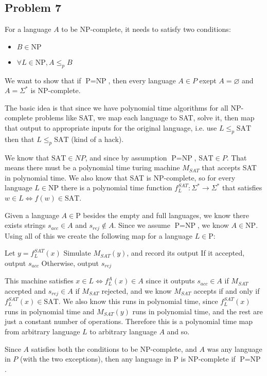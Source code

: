 \documentclass[english]{article}
\begin{document}
\subsection*{Problem 7}
For a language $A$ to be NP-complete, it needs to satisfy two conditions:
\begin{itemize}
\item $B \in \textrm{NP}$
\item $\forall L \in \textrm{NP}, A \le_p B$
\end{itemize}
We want to show that if $\textrm{P} = \textrm{NP}$, then every language
$A \in P$ exept $A = \varnothing$ and $A = \Sigma^*$ is NP-complete. 

The basic idea is that since we have polynomial time algorithms for all
NP-complete problems like SAT, we map each language to SAT, solve it, then map
that output to appropriate inputs for the original language, i.e. use
$L \le_p \textrm{SAT}$ then that $L \le_p \textrm{SAT}$ (kind of a hack). 

We know that $\textrm{SAT} \in NP$, and since by assumption
$\textrm{P} = \textrm{NP}$, $\textrm{SAT} \in P$. That means there must be a
polynomial time turing machine $M_{SAT}$ that accepts SAT in polynomial time.
We also know that SAT is NP-complete, so for every language $L \in \textrm{NP}$
there is a polynomial time function $f^{SAT}_L : \Sigma^* \rightarrow \Sigma^*$
that satisfies $w \in L \iff f(w) \in \textrm{SAT}$.

Given a language $A \in \textrm{P}$ besides the empty and full languages, we 
know there exists strings $s_{acc} \in A$ and $s_{rej} \notin A$. Since
we assume $\textrm{P} = \textrm{NP}$, we know $A \in \textrm{NP}$. Using all of
this we create the following map for a language $L \in \textrm{P}$:
\begin{algorithmic}
\State Let $y = f^{SAT}_L(x)$
\State Simulate $M_{SAT}(y)$, and record its output
\State If it accepted, output $s_{acc}$
\State Otherwise, output $s_{rej}$
\EndFunction 
\end{algorithmic}

This machine satisfies $x \in L \iff f^A_L(x) \in A$ since it outputs 
$s_{acc} \in A$ if $M_{SAT}$ accepted and $s_{rej} \in A$ if $M_{SAT}$
rejected, and we know $M_{SAT}$ accepts if and only if
$f^{SAT}_L(x) \in \textrm{SAT}$. We also know this runs in polynomial time,
since $f^{SAT}_L(x)$ runs in polynomial time and $M_{SAT}(y)$ runs in 
polynomial time, and the rest are just a constant number of operations.
Therefore this is a polynomial time map from arbitrary language $L$ to 
arbitrary language $A$ and so.

Since $A$ satisfies both the conditions to be NP-complete, and $A$ was 
any language in $P$ (with the two exceptions), then any language in P is
NP-complete if $\textrm{P} = \textrm{NP}$.
\end{document}
